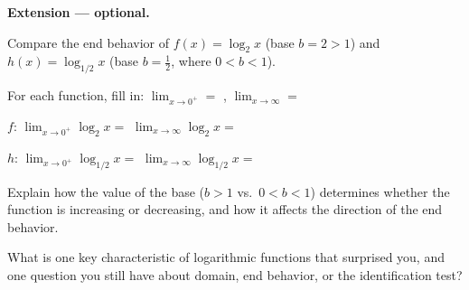 \documentclass[10pt]{article}
\begin{document}
\begin{extensionbox}
\textbf{Extension --- optional.}

Compare the end behavior of $f(x) = \log_2 x$ (base $b = 2 > 1$) and $h(x) = \log_{1/2} x$
(base $b = \tfrac{1}{2}$, where $0 < b < 1$).

\vspace{6pt}
For each function, fill in: \quad $\displaystyle\lim_{x \to 0^+} = $ \blank{2.5cm}, \quad
$\displaystyle\lim_{x \to \infty} = $ \blank{2.5cm}

\vspace{6pt}
$f$: \quad $\displaystyle\lim_{x \to 0^+}\log_2 x = $ \blank{2cm} \quad
$\displaystyle\lim_{x \to \infty}\log_2 x = $ \blank{2cm}

\vspace{6pt}
$h$: \quad $\displaystyle\lim_{x \to 0^+}\log_{1/2} x = $ \blank{2cm} \quad
$\displaystyle\lim_{x \to \infty}\log_{1/2} x = $ \blank{2cm}

\vspace{6pt}
Explain how the value of the base ($b > 1$ vs.\ $0 < b < 1$) determines whether the function
is increasing or decreasing, and how it affects the direction of the end behavior.

\end{extensionbox}

\vspace{0.1in}

\begin{reflectionbox}
What is one key characteristic of logarithmic functions that surprised you, and one question you
still have about domain, end behavior, or the identification test?

\end{reflectionbox}
\end{document}
